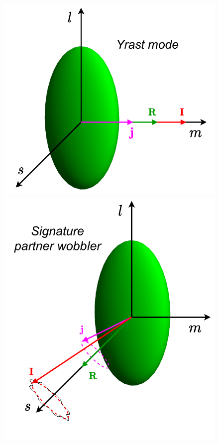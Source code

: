 \begin{figure}
    \centering
    \includegraphics[scale=0.55]{Chapters/Figures/yrast_wobbler-schematic.pdf}
    \includegraphics[scale=0.55]{Chapters/Figures/signaturePartner_wobbler-schematic.pdf}

\end{figure}
